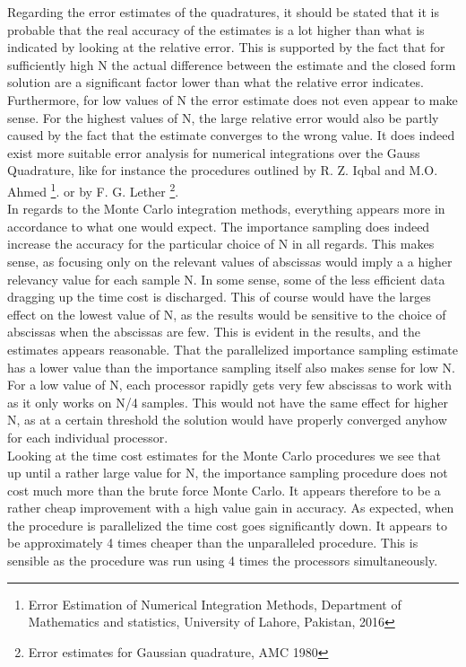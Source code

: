 \documentclass[%
reprint,nofootinbib,
amsmath,amssymb,
aps,
]{revtex4-1}
\begin{document}
Regarding the error estimates of the quadratures, it should be stated that it is probable that the real accuracy  of the estimates is a lot higher than what is indicated by looking at the relative error. This is supported by the fact that for sufficiently high N the actual difference between the estimate and the closed form solution are a significant factor lower than what the relative error indicates. Furthermore, for low values of N the error estimate does not even appear to make sense. For the highest values of N, the large relative error would also be partly caused by the fact that the estimate converges to the wrong value. It does indeed exist more suitable error analysis for numerical integrations over the Gauss Quadrature, like for instance the procedures outlined by R. Z. Iqbal and M.O. Ahmed \footnote{Error Estimation of Numerical Integration Methods, Department of Mathematics and statistics, University of Lahore, Pakistan, 2016}. or by F. G. Lether \footnote{Error estimates for Gaussian quadrature, AMC 1980}. \\ \indent 
In regards to the Monte Carlo integration methods, everything appears more in accordance to what one would expect. The importance sampling does indeed increase the accuracy for the particular choice of N in all regards. This makes sense, as focusing only on the relevant values of abscissas would imply a a higher relevancy value for each sample N. In some sense, some of the less efficient data dragging up the time cost is discharged. This of course would have the larges effect on the lowest value of N, as the results would be sensitive to the choice of abscissas when the abscissas are few. This is evident in the results, and the estimates appears reasonable. That the parallelized importance sampling estimate has a lower value than the importance sampling itself also makes sense for low N. For a low value of N, each processor rapidly gets very few abscissas to work with as it only works on N/4 samples. This would not have the same effect for higher N, as at a certain threshold the solution would have properly converged anyhow for each individual processor. \\ \indent 
Looking at the time cost estimates for the Monte Carlo procedures we see that up until a rather large value for N, the importance sampling procedure does not cost much more than the brute force Monte Carlo. It appears therefore to be a rather cheap improvement with a high value gain in accuracy. As expected, when the procedure is parallelized the time cost goes significantly down. It appears to be approximately 4 times cheaper than the unparalleled procedure. This is sensible as the procedure was run using 4 times the processors simultaneously.\\ \indent 
\end{document}
